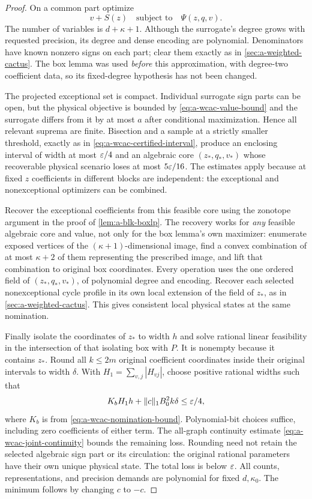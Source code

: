 \begin{proof}
On a common part optimize
\[
 v+S(z)\quad\text{subject to}\quad\Psi(z,q,v).
\]
The number of variables is $d+\kappa+1$. Although the surrogate's
degree grows with requested precision, its degree and dense encoding
are polynomial. Denominators have known nonzero signs on each part;
clear them exactly as in \cref{sec:a-weighted-cactus}. The box lemma
was used \emph{before} this approximation, with degree-two coefficient
data, so its fixed-degree hypothesis has not been changed.

The projected exceptional set is compact. Individual surrogate sign
parts can be open, but the physical objective is bounded by
\eqref{eq:a-wcac-value-bound} and the surrogate differs from it by at
most $a$ after conditional maximization. Hence all relevant suprema are
finite. Bisection and a sample at a strictly smaller threshold, exactly
as in \eqref{eq:a-wcac-certified-interval}, produce an enclosing interval
of width at most $\varepsilon/4$ and an algebraic core $(z_*,q_*,v_*)$ whose
recoverable physical scenario loses at most $5\varepsilon/16$. The estimates
apply because at fixed $z$ coefficients in different blocks are independent:
the exceptional and nonexceptional optimizers can be combined.

Recover the exceptional coefficients from this feasible core using the
zonotope argument in the proof of \cref{lem:a-blk-boxlp}. The recovery
works for \emph{any} feasible algebraic core and value, not only for the
box lemma's own maximizer: enumerate exposed vertices of the
$(\kappa+1)$-dimensional image, find a convex combination of at most
$\kappa+2$ of them representing the prescribed image, and lift that
combination to original box coordinates. Every operation uses the one
ordered field of $(z_*,q_*,v_*)$, of polynomial degree and encoding.
Recover each selected nonexceptional cycle profile in its own local
extension of the field of $z_*$, as in \cref{sec:a-weighted-cactus}.
This gives consistent local physical states at the same nomination.

Finally isolate the coordinates of $z_*$ to width $h$ and solve rational
linear feasibility in the intersection of that isolating box with $P$.
It is nonempty because it contains $z_*$. Round all $k\le2m$ original
coefficient coordinates inside their original intervals to width
$\delta$. With $H_1=\sum_{v,j}|H_{vj}|$, choose positive rational widths
such that
\[
 K_bH_1h+\|c\|_1B_0^2k\delta\le\varepsilon/4,
\]
where $K_b$ is from \eqref{eq:a-wcac-nomination-bound}. Polynomial-bit
choices suffice, including zero coefficients of either term. The
all-graph continuity estimate \eqref{eq:a-wcac-joint-continuity} bounds
the remaining loss. Rounding need not retain the selected algebraic
sign part or its circulation: the original rational parameters have
their own unique physical state. The total loss is below $\varepsilon$.
All counts, representations, and precision demands are polynomial for
fixed $d,\kappa_0$. The minimum follows by changing $c$ to $-c$.
\end{proof}

